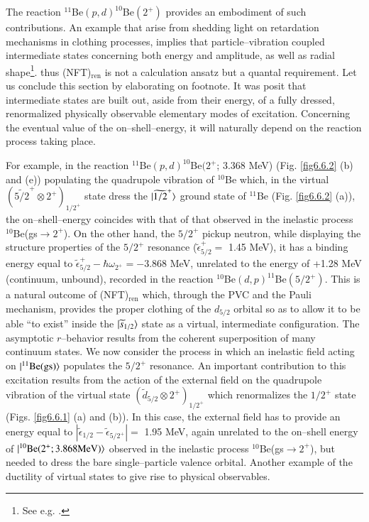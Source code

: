 The reaction $^{11}$Be$(p,d)^{10}$Be$(2^+)$ provides an embodiment of such contributions. An example that arise from shedding light on retardation mechanisms in clothing processes, implies that particle--vibration coupled intermediate states concerning both energy and amplitude, as well as radial shape\footnote{See e.g. \cite{Barranco:17}.}. thus (NFT)$_{\text{ren}}$ is not a calculation ansatz but a quantal requirement. Let us conclude this section by elaborating on footnote. It was posit that intermediate states are built out, aside from their energy, of a fully dressed, renormalized physically observable elementary modes of excitation. Concerning the eventual value of the on--shell--energy, it will naturally depend on the reaction process taking place.

For example, in the reaction $^{11}$Be$(p,d)^{10}$Be$(2^+$; 3.368 MeV) (Fig. \ref{fig6.6.2} (b) and (e)) populating the quadrupole vibration of $^{10}$Be which, in the virtual $(\widetilde{5/2}^+\otimes 2^+)_{1/2^+}$ state dress the $|{\widetilde{1/2}^+} \rangle$ ground state of $^{11}$Be (Fig. \ref{fig6.6.2} (a)), the on--shell--energy coincides with that of that observed in the inelastic process $^{10}$Be(gs$\to 2^+$). On the other hand, the $5/2^+$ pickup neutron, while displaying the structure properties of the $5/2^+$ resonance ($\tilde{\epsilon}_{5/2}^+=$ 1.45 MeV), it has a binding energy equal to $\tilde{\epsilon}_{5/2}^+-\hbar\omega_{2^+}=-3.868$ MeV, unrelated to the energy of +1.28 MeV (continuum, unbound), recorded in the reaction $^{10}$Be$(d,p)^{11}$Be$(5/2^+)$. This is a natural outcome of (NFT)$_{\text{ren}}$ which, through the PVC and the Pauli mechanism, provides the proper clothing of the $d_{5/2}$ orbital so as to allow it to be able ``to exist'' inside the $|{\widetilde s_{1/2}} \rangle$ state as a virtual, intermediate configuration. The asymptotic $r$--behavior results from the coherent superposition of many continuum states. We now consider the process in which an inelastic field acting on $|{^{11}\text{Be(gs)}} \rangle$ populates the $5/2^+$ resonance. An important contribution to this excitation results from the action of the external field on the quadrupole vibration of the virtual state $(\tilde d_{5/2}\otimes 2^+)_{1/2^+}$ which renormalizes the $1/2^+$ state (Figs. \ref{fig6.6.1} (a) and (b)). In this case, the external field has to provide an energy equal to $|\tilde \epsilon_{1/2}-\tilde \epsilon_{5/2^+}|=$ 1.95 MeV, again unrelated to the on--shell energy of $|{^{10}\text{Be}(2^+; 3.868\text{MeV})} \rangle$ observed in the inelastic process $^{10}$Be(gs$\to2^+$), but needed to dress the bare single--particle valence orbital. Another example of the ductility of virtual states to give rise to physical observables.
